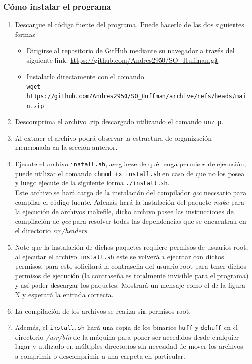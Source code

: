 \documentclass{report}
\begin{document}
\subsubsection{Cómo instalar el programa}
\begin{enumerate}
  \item Descargue el código fuente del programa. Puede hacerlo de las dos siguientes formas:
    \begin{itemize}
      \item Dirigirse al repositorio de GitHub mediante su navegador a través del siguiente link: \url{https://github.com/Andres2950/SO\_Huffman.git}
      \item Instalarlo directamente con el comando \\
    \texttt{wget \url{https://github.com/Andres2950/SO\_Huffman/archive/refs/heads/main.zip}}
    \end{itemize}
  \item Descomprima el archivo .zip descargado utilizando el comando \texttt{unzip}.
\item Al extraer el archivo podrá observar la estructura de organización mencionada en la sección anterior.
\item Ejecute el archivo \texttt{install.sh}, asegúrese de qué tenga permisos de ejecución, puede utilizar el comando \texttt{chmod +x install.sh} en caso de que no los posea y luego ejecute de la siguiente forma \texttt{./install.sh}. \\
  Este archivo se hará cargo de la instalación del compilador \textit{gcc} necesario para compilar el código fuente. Además hará la instalación del paquete \textit{make} para la ejecución de archivos makefile, dicho archivo posee las instrucciones de compilación de \textit{gcc} para resolver todas las dependencias que se encuentran en el directorio \textit{src/headers}.  
\item Note que la instalación de dichos paquetes requiere permisos de usuarios root, al ejecutar el archivo \texttt{install.sh} este se volverá a ejecutar con dichos permisos, para esto solicitará la contraseña del usuario root para tener dichos permisos de ejecución (la contraseña es totalmente invisible para el programa) y así poder descargar los paquetes. Mostrará un mensaje como el de la figura N y esperará la entrada correcta.
\item La compilación de los archivos se realiza sin permisos root.
\item Además, el \texttt{install.sh} hará una copia de los binarios \texttt{huff} y \texttt{dehuff} en el directorio \textit{/usr/bin} de la máquina para poner ser accedidos desde cualquier lugar y utilizado en múltiples directorios sin necesidad de mover los archivos a comprimir o descomprimir a una carpeta en particular.

\end{enumerate}
\end{document}
